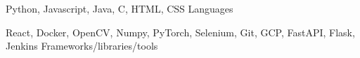

\begin{cventries}

  \cventry
    {Python, Javascript, Java, C, HTML, CSS} %
    {Languages} %
    {} %
    {} %
    {}

\cventry
{React, Docker, OpenCV, Numpy, PyTorch, Selenium, Git, GCP, FastAPI, Flask, Jenkins} %
{Frameworks/libraries/tools} %
{} %
{} %
{}

\end{cventries}
